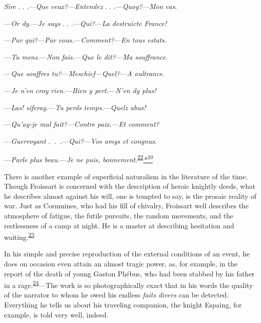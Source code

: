 \emph{\protect\hypertarget{21_Chapter_Thirteen__IMAGE_AND_WORD.xhtmlux5cux23page_349}{}{}Sire}
. . .---\emph{Que veux?}---\emph{Entendez} . .
.---\emph{Quoy?}---\emph{Mon cas}.

---\emph{Or dy}.---\emph{Je suys} . . .---\emph{Qui?}---\emph{La
destruicte France!}

---\emph{Par qui?}---\emph{Par vous}.---\emph{Comment?}---\emph{En tous
estats}.

---\emph{Tu mens}.---\emph{Non fais}.---\emph{Que le dit?}---\emph{Ma
souffrance}.

---\emph{Que souffres tu?}---\emph{Meschief}---\emph{Quel?}---\emph{A
oultrance}.

---\emph{Je n'en croy rien}.---\emph{Bien y pert}.---\emph{N'en dy
plus!}

---\emph{Las! siferay}.---\emph{Tu perds temps}.---\emph{Quelz abus!}

---\emph{Qu'ay-je mal fait?}---\emph{Contre paix}.---\emph{Et comment?}

---\emph{Guerroyant .~.~}.---\emph{Qui?}---\emph{Vos amys et congnus}.

---\emph{Parle plus beau}.---\emph{Je ne puis,
bonnement}.\textsuperscript{\protect\hypertarget{21_Chapter_Thirteen__IMAGE_AND_WORD.xhtmlux5cux23id_266}{\protect\hyperlink{23_NOTES.xhtmlux5cux23id_267}{22}}}\emph{\protect\hypertarget{21_Chapter_Thirteen__IMAGE_AND_WORD.xhtmlux5cux23id_2733}{\protect\hyperlink{23_NOTES.xhtmlux5cux23id_2734}{*\textsuperscript{20}}}}

There is another example of superficial naturalism in the literature of
the time. Though Froissart is concerned with the description of heroic
knightly deeds, what he describes almost against his will, one is
tempted to say, is the prosaic reality of war. Just as Cornmines, who
had his fill of chivalry, Froissart well describes the atmosphere of
fatigue, the futile pursuits, the random movements, and the restlessness
of a camp at night. He is a master at describing hesitation and
waiting.\textsuperscript{\protect\hypertarget{21_Chapter_Thirteen__IMAGE_AND_WORD.xhtmlux5cux23id_264}{\protect\hyperlink{23_NOTES.xhtmlux5cux23id_265}{23}}}

In his simple and precise reproduction of the external conditions of an
event, he does on occasion even attain an almost tragic power, as, for
example, in the report of the death of young Gaston Phébus, who had been
stabbed by his father in a
rage.\textsuperscript{\protect\hypertarget{21_Chapter_Thirteen__IMAGE_AND_WORD.xhtmlux5cux23id_262}{\protect\hyperlink{23_NOTES.xhtmlux5cux23id_263}{24}}}---The
work is so photographically exact that in his words the quality of the
narrator to whom he owed his endless \emph{faits divers} can be
detected. Everything he tells us about his traveling companion, the
knight Espaing, for example, is told very well, indeed.

